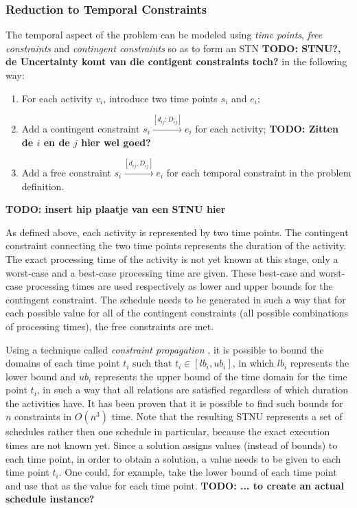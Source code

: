 \documentclass{article}
\newcommand{\TODO}[1]{{\color{red}\textbf{TODO: #1}}}
\begin{document}
\subsubsection{Reduction to Temporal Constraints}
The temporal aspect of the problem can be modeled using \emph{time points}, \emph{free constraints} and \emph{contingent constraints} so as to form an STN \TODO{STNU?, de Uncertainty komt van die contigent constraints toch?} in the following way:
\begin{enumerate}
\item For each activity $v_i$, introduce two time points $s_i$ and $e_i$;
\item Add a contingent constraint $s_i \xrightarrow{[d_{ij}:D_{ij}]} e_i$ for each activity; \TODO{Zitten de $i$ en de $j$ hier wel goed?}
\item Add a free constraint $s_i \xrightarrow{[d_{ij},D_{ij}]} e_i$ for each temporal constraint in the problem definition.
\end{enumerate}

\TODO{insert hip plaatje van een STNU hier}

As defined above, each activity is represented by two time points.
The contingent constraint connecting the two time points represents the duration of the activity.
The exact processing time of the activity is not yet known at this stage, only a worst-case and a best-case processing time are given.
These best-case and worst-case processing times are used respectively as lower and upper bounds for the contingent constraint.
The schedule needs to be generated in such a way that for each possible value for all of the contingent constraints (all possible combinations of processing times), the free constraints are met.

Using a technique called \emph{constraint propagation} \cite{policella07}, it is possible to bound the domains of each time point $t_i$ such that $t_i \in [lb_i, ub_i]$, in which $lb_i$ represents the lower bound and $ub_i$ represents the upper bound of the time domain for the time point $t_i$, in such a way that all relations are satisfied regardless of which duration the activities have.
It has been proven that it is possible to find such bounds for $n$ constraints in $O(n^3)$ time.
Note that the resulting STNU represents a set of schedules rather then one schedule in particular, because the exact execution times are not known yet.
Since a solution assigns values (instead of bounds) to each time point, in order to obtain a solution, a value needs to be given to each time point $t_i$.
One could, for example, take the lower bound of each time point and use that as the value for each time point.
\TODO{... to create an actual schedule instance?}
\end{document}
